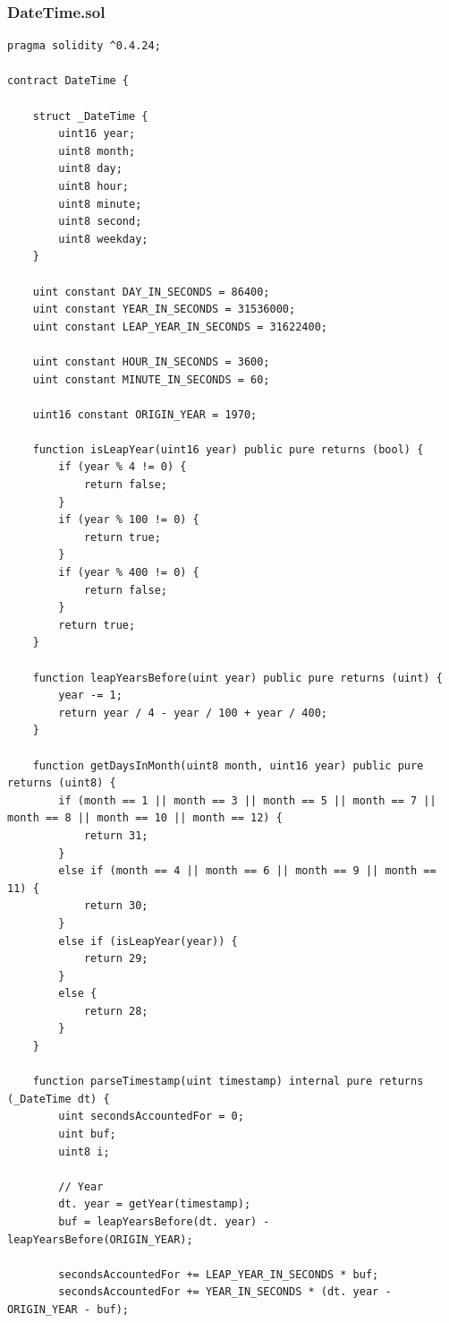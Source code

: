 \documentclass[a4paper]{article}
\begin{document}
\begin{frame}
\frametitle{DateTime.sol}
\begin{lstlisting}[basicstyle=\small]
pragma solidity ^0.4.24;

contract DateTime {

    struct _DateTime {
        uint16 year;
        uint8 month;
        uint8 day;
        uint8 hour;
        uint8 minute;
        uint8 second;
        uint8 weekday;
    }

    uint constant DAY_IN_SECONDS = 86400;
    uint constant YEAR_IN_SECONDS = 31536000;
    uint constant LEAP_YEAR_IN_SECONDS = 31622400;

    uint constant HOUR_IN_SECONDS = 3600;
    uint constant MINUTE_IN_SECONDS = 60;

    uint16 constant ORIGIN_YEAR = 1970;

    function isLeapYear(uint16 year) public pure returns (bool) {
        if (year % 4 != 0) {
            return false;
        }
        if (year % 100 != 0) {
            return true;
        }
        if (year % 400 != 0) {
            return false;
        }
        return true;
    }

    function leapYearsBefore(uint year) public pure returns (uint) {
        year -= 1;
        return year / 4 - year / 100 + year / 400;
    }

    function getDaysInMonth(uint8 month, uint16 year) public pure returns (uint8) {
        if (month == 1 || month == 3 || month == 5 || month == 7 || month == 8 || month == 10 || month == 12) {
            return 31;
        }
        else if (month == 4 || month == 6 || month == 9 || month == 11) {
            return 30;
        }
        else if (isLeapYear(year)) {
            return 29;
        }
        else {
            return 28;
        }
    }
    
    function parseTimestamp(uint timestamp) internal pure returns (_DateTime dt) {
        uint secondsAccountedFor = 0;
        uint buf;
        uint8 i;

        // Year
        dt. year = getYear(timestamp);
        buf = leapYearsBefore(dt. year) - leapYearsBefore(ORIGIN_YEAR);

        secondsAccountedFor += LEAP_YEAR_IN_SECONDS * buf;
        secondsAccountedFor += YEAR_IN_SECONDS * (dt. year - ORIGIN_YEAR - buf);


\end{lstlisting}
\end{frame}
\end{document}
